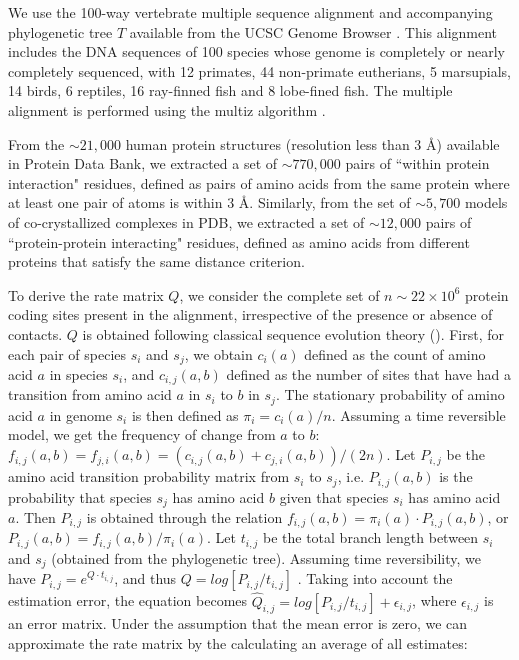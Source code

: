 We use the 100-way vertebrate multiple sequence alignment and accompanying phylogenetic tree $T$ available from the UCSC Genome Browser \cite{karolchik2014ucsc}. 
This alignment includes the DNA sequences of 100 species whose genome is completely or nearly completely sequenced, with 12 primates, 44 non-primate eutherians, 5 marsupials, 14 birds, 6 reptiles, 16 ray-finned fish and 8 lobe-fined fish.
The multiple alignment is performed using the multiz algorithm \cite{blanchette2004aligning,kielbasa2011adaptive}.

From the $\sim21,000$ human protein structures (resolution less than $3$ \r{A}) available in Protein Data Bank, we extracted a set of $\sim770,000$ pairs of ``within protein interaction" residues, defined as pairs of amino acids from the same protein where at least one pair of atoms is within $3$ \r{A}. 
Similarly, from the set of $\sim5,700$ models of co-crystallized complexes in PDB, we extracted a set of $\sim12,000$ pairs of ``protein-protein interacting" residues, defined as amino acids from different proteins that satisfy the same distance criterion.

To derive the rate matrix $Q$, we consider the complete set of $n \sim 22 \times 10^6$ protein coding sites present in the alignment, irrespective of the presence or absence of contacts. $Q$ is obtained following classical sequence evolution theory (\cite{yang2006computational, felsenstein2004inferring}). 
First, for each pair of species  $s_i$ and $s_j$, we obtain $c_i(a)$ defined as the count of amino acid $a$ in species $s_i$, and $c_{i,j}(a,b)$ defined as the number of sites that have had a transition from amino acid $a$ in $s_i$ to $b$ in $s_j$. 
The stationary probability of amino acid $a$ in genome $s_i$ is then defined as $\pi_i = c_i(a)/n$. 
Assuming a time reversible model, we get the frequency of change from $a$ to $b$: $f_{i,j}(a,b) = f_{j,i}(a,b) = (c_{i,j}(a,b) + c_{j,i}(a,b))/(2n)$. Let $P_{i,j}$ be the amino acid transition probability matrix from $s_i$ to $s_j$, i.e. $P_{i,j}(a,b)$ is the probability that species $s_j$ has amino acid $b$ given that species $s_i$ has amino acid $a$. 
Then $P_{i,j}$ is obtained through the relation $f_{i,j}(a,b) = \pi_i(a) \cdot P_{i,j}(a,b)$, or $P_{i,j}(a,b) =   f_{i,j}(a,b) /  \pi_i(a)$. 
Let $t_{i,j}$ be the total branch length between $s_i$ and $s_j$ (obtained from the phylogenetic tree). 
Assuming time reversibility, we have $P_{i,j} = e^{Q \cdot t_{i,j}}$, and thus $Q=log[ P_{i,j} / t_{i,j} ]$ \cite{yang2006computational}. 
Taking into account the estimation error, the equation becomes $\hat{Q}_{i,j} = log[ P_{i,j} / t_{i,j} ] + \epsilon_{i,j}$, where $\epsilon_{i,j}$ is an error matrix. Under the assumption that the mean error is zero, we can approximate the rate matrix by the calculating an average of all estimates:

